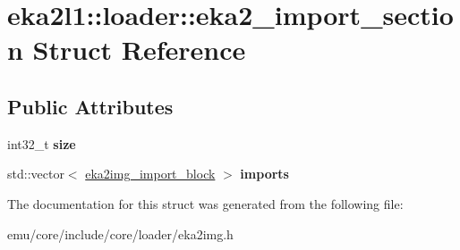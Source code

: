 \hypertarget{structeka2l1_1_1loader_1_1eka2__import__section}{}\section{eka2l1\+:\+:loader\+:\+:eka2\+\_\+import\+\_\+section Struct Reference}
\label{structeka2l1_1_1loader_1_1eka2__import__section}
\subsection*{Public Attributes}
\begin{DoxyCompactItemize}
\item 
\mbox{\label{structeka2l1_1_1loader_1_1eka2__import__section_a46e79438a13f4d2779692caf40c45d03}} 
int32\+\_\+t {\bfseries size}
\item 
\mbox{\label{structeka2l1_1_1loader_1_1eka2__import__section_ad2af0f7360ff07b65736c4ec7afba163}} 
std\+::vector$<$ \mbox{\hyperlink{structeka2l1_1_1loader_1_1eka2img__import__block}{eka2img\+\_\+import\+\_\+block}} $>$ {\bfseries imports}
\end{DoxyCompactItemize}


The documentation for this struct was generated from the following file\+:\begin{DoxyCompactItemize}
\item 
emu/core/include/core/loader/eka2img.\+h\end{DoxyCompactItemize}
